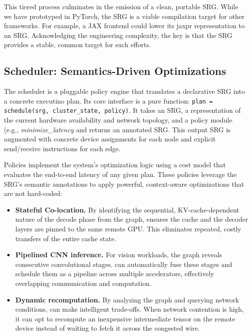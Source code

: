 This tiered process culminates in the emission of a clean, portable SRG. 
While we have prototyped in PyTorch, the SRG is a viable compilation target for other frameworks. 
For example, a JAX frontend could lower its jaxpr representation to an SRG. 
Acknowledging the engineering complexity, the key is that the SRG provides a stable, common target for such efforts.



\subsection{Scheduler: Semantics-Driven Optimizations}
\label{ssec:optimization}
The scheduler is a pluggable policy engine that translates a declarative SRG into a concrete executino plan.
Its core interface is a pure function:
\texttt{plan = schedule(srg, cluster\_state, policy)}.
It takes an SRG, a representation of the current hardware availability and network topology, and a policy module (e.g., \textit{minimize\_latency} and returns an annotated SRG.
This output SRG is augmented with concrete device assignments for each node and explicit send/receive instructions for each edge.

Policies implement the system's optimization logic using a cost model that evaluates the end-to-end latency of any given plan.
These policies leverage the SRG's semantic annotations to apply powerful, context-aware optimizations that are not hard-coded:

\begin{itemize}[left=0pt]
    \item \textbf{Stateful Co-location.} By identifying the sequential, KV-cache-dependent nature of the decode phase from the graph, \sys{} ensures the cache and the decoder layers are pinned to the same remote GPU. This eliminates repeated, costly transfers of the entire cache state.
    \item \textbf{Pipelined CNN inference.} For vision workloads, the graph reveals consecutive convolutional stages. \sys{} can automatically fuse these stages and schedule them as a pipeline across multiple accelerators, effectively overlapping communication and computation.
    \item \textbf{Dynamic recomputation.} By analyzing the graph and querying network conditions, \sys{} can make intelligent trade-offs. When network contention is high, it can opt to recompute an inexpensive intermediate tensor on the remote device instead of waiting to fetch it across the congested wire.
\end{itemize}

